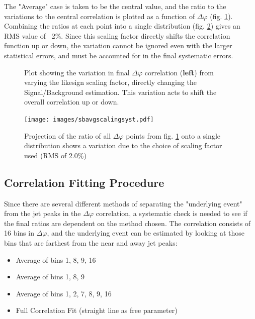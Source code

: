 \documentclass[ALICE,manyauthors]{ALICE_analysis_notes}
\begin{document}
\begin{itemize}
The "Average" case is taken to be the central value, and the ratio to the variations to the central correlation is plotted as a function of $\Delta\varphi$ (fig. \ref{scalingcheck}). Combining the ratios at each point into a single distribution (fig. \ref{scalingRMS}) gives an RMS value of ~2\%.  Since this scaling factor directly shifts the correlation function up or down, the variation cannot be ignored even with the larger statistical errors, and must be accounted for in the final systematic errors.

\begin{figure}[ht]
\centering
\begin{subfigure}{
\texttt{[image: images/sbscalingdphi.pdf]}}
\end{subfigure}
\begin{subfigure}{
\texttt{[image: images/sbavgscalingratios.pdf]}}
\end{subfigure}
\caption{Plot showing the variation in final $\Delta\varphi$ correlation (\textbf{left}) from varying the likesign scaling factor, directly changing the Signal/Background estimation.  This variation acts to shift the overall correlation up or down.}
\label{scalingcheck}
\end{figure}

\begin{figure}[ht]
\centering
\texttt{[image: images/sbavgscalingsyst.pdf]}
\caption{Projection of the ratio of all $\Delta\varphi$ points from fig. \ref{scalingcheck} onto a single distribution shows a variation due to the choice of scaling factor used (RMS of 2.0\%)}
\label{scalingRMS}
\end{figure}

\subsection{Correlation Fitting Procedure}
\label{corrfitproc}
Since there are several different methods of separating the "underlying event" from the jet peaks in the $\Delta\varphi$ correlation, a systematic check is needed to see if the final ratios are dependent on the method chosen.  The correlation consists of 16 bins in $\Delta\varphi$, and the underlying event can be estimated by looking at those bins that are farthest from the near and away jet peaks:

\begin{center}
\begin{itemize}
    \item Average of bins 1, 8, 9, 16
    \item Average of bins 1, 8, 9
    \item Average of bins 1, 2, 7, 8, 9, 16
    \item Full Correlation Fit (straight line as free parameter)
\end{itemize}
\end{center}


\end{itemize}
\end{document}
